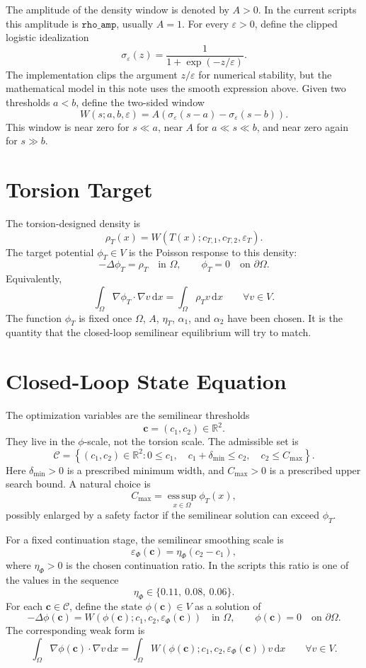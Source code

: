 \documentclass[11pt]{article}
\newcommand{\dd}{\,\mathrm d}
\newcommand{\R}{\mathbb R}
\newcommand{\OmegaD}{\Omega}
\newcommand{\V}{V}
\newcommand{\sig}{\sigma}
\newcommand{\W}{W}
\newcommand{\cvec}{\bm c}
\newcommand{\phit}{\phi_T}
\newcommand{\rhot}{\rho_T}
\newcommand{\epsT}{\varepsilon_T}
\newcommand{\epsp}{\varepsilon_\Phi}
\begin{document}
The amplitude of the density window is denoted by \(A>0\).  In the current
scripts this amplitude is \(\texttt{rho\_amp}\), usually \(A=1\).  For every
\(\varepsilon>0\), define the clipped logistic idealization
\[
  \sig_\varepsilon(z)
  =
  \frac{1}{1+\exp(-z/\varepsilon)}.
\]
The implementation clips the argument \(z/\varepsilon\) for numerical
stability, but the mathematical model in this note uses the smooth expression
above.  Given two thresholds \(a<b\), define the two-sided window
\[
  \boxed{
  \W(s;a,b,\varepsilon)
  =
  A\left(\sig_\varepsilon(s-a)-\sig_\varepsilon(s-b)\right).
  }
\]
This window is near zero for \(s\ll a\), near \(A\) for \(a\ll s\ll b\), and
near zero again for \(s\gg b\).

\section{Torsion Target}

The torsion-designed density is
\[
  \rhot(x)
  =
  \W(T(x);c_{T,1},c_{T,2},\epsT).
\]
The target potential \(\phit\in\V\) is the Poisson response to this density:
\[
  -\Delta \phit = \rhot
  \quad \text{in } \OmegaD,
  \qquad
  \phit=0
  \quad \text{on } \partial\OmegaD.
\]
Equivalently,
\[
  \int_{\OmegaD}\nabla \phit\cdot\nabla v\dd x
  =
  \int_{\OmegaD}\rhot v\dd x
  \qquad
  \forall v\in\V.
\]
The function \(\phit\) is fixed once \(\OmegaD\), \(A\), \(\eta_T\),
\(\alpha_1\), and \(\alpha_2\) have been chosen.  It is the quantity that the
closed-loop semilinear equilibrium will try to match.

\section{Closed-Loop State Equation}

The optimization variables are the semilinear thresholds
\[
  \cvec = (c_1,c_2)\in\R^2.
\]
They live in the \(\phi\)-scale, not the torsion scale.  The admissible set is
\[
  \mathcal C
  =
  \left\{
    (c_1,c_2)\in\R^2:
    0\le c_1,\quad
    c_1+\delta_{\min}\le c_2,\quad
    c_2\le C_{\max}
  \right\}.
\]
Here \(\delta_{\min}>0\) is a prescribed minimum width, and \(C_{\max}>0\) is
a prescribed upper search bound.  A natural choice is
\[
  C_{\max} = \operatorname*{ess\,sup}_{x\in\OmegaD}\phit(x),
\]
possibly enlarged by a safety factor if the semilinear solution can exceed
\(\phit\).

For a fixed continuation stage, the semilinear smoothing scale is
\[
  \epsp(\cvec) = \eta_\Phi(c_2-c_1),
\]
where \(\eta_\Phi>0\) is the chosen continuation ratio.  In the scripts this
ratio is one of the values in the sequence
\[
  \eta_\Phi\in \{0.11,\ 0.08,\ 0.06\}.
\]
For each \(\cvec\in\mathcal C\), define the state
\(\phi(\cvec)\in\V\) as a solution of
\[
  -\Delta\phi(\cvec)
  =
  \W\!\left(
    \phi(\cvec);c_1,c_2,\epsp(\cvec)
  \right)
  \quad \text{in } \OmegaD,
  \qquad
  \phi(\cvec)=0
  \quad \text{on } \partial\OmegaD.
\]
The corresponding weak form is
\[
  \int_{\OmegaD}\nabla\phi(\cvec)\cdot\nabla v\dd x
  =
  \int_{\OmegaD}
    \W\!\left(\phi(\cvec);c_1,c_2,\epsp(\cvec)\right)v
  \dd x
  \qquad
  \forall v\in\V.
\]
\end{document}
